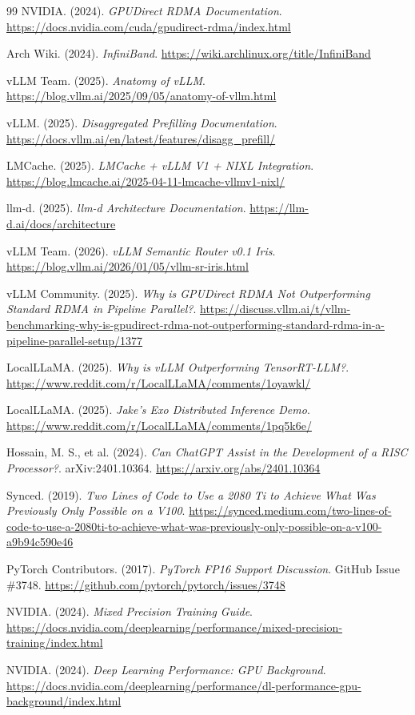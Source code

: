 \documentclass[10pt,letterpaper]{article}
\begin{document}
\begin{thebibliography}{99}
NVIDIA. (2024). \textit{GPUDirect RDMA Documentation}. \url{https://docs.nvidia.com/cuda/gpudirect-rdma/index.html}

Arch Wiki. (2024). \textit{InfiniBand}. \url{https://wiki.archlinux.org/title/InfiniBand}

vLLM Team. (2025). \textit{Anatomy of vLLM}. \url{https://blog.vllm.ai/2025/09/05/anatomy-of-vllm.html}

vLLM. (2025). \textit{Disaggregated Prefilling Documentation}. \url{https://docs.vllm.ai/en/latest/features/disagg_prefill/}

LMCache. (2025). \textit{LMCache + vLLM V1 + NIXL Integration}. \url{https://blog.lmcache.ai/2025-04-11-lmcache-vllmv1-nixl/}

llm-d. (2025). \textit{llm-d Architecture Documentation}. \url{https://llm-d.ai/docs/architecture}

vLLM Team. (2026). \textit{vLLM Semantic Router v0.1 Iris}. \url{https://blog.vllm.ai/2026/01/05/vllm-sr-iris.html}

vLLM Community. (2025). \textit{Why is GPUDirect RDMA Not Outperforming Standard RDMA in Pipeline Parallel?}. \url{https://discuss.vllm.ai/t/vllm-benchmarking-why-is-gpudirect-rdma-not-outperforming-standard-rdma-in-a-pipeline-parallel-setup/1377}

LocalLLaMA. (2025). \textit{Why is vLLM Outperforming TensorRT-LLM?}. \url{https://www.reddit.com/r/LocalLLaMA/comments/1oyawkl/}

LocalLLaMA. (2025). \textit{Jake's Exo Distributed Inference Demo}. \url{https://www.reddit.com/r/LocalLLaMA/comments/1pq5k6e/}

Hossain, M. S., et al. (2024). \textit{Can ChatGPT Assist in the Development of a RISC Processor?}. arXiv:2401.10364. \url{https://arxiv.org/abs/2401.10364}

Synced. (2019). \textit{Two Lines of Code to Use a 2080 Ti to Achieve What Was Previously Only Possible on a V100}. \url{https://synced.medium.com/two-lines-of-code-to-use-a-2080ti-to-achieve-what-was-previously-only-possible-on-a-v100-a9b94c590e46}

PyTorch Contributors. (2017). \textit{PyTorch FP16 Support Discussion}. GitHub Issue \#3748. \url{https://github.com/pytorch/pytorch/issues/3748}

NVIDIA. (2024). \textit{Mixed Precision Training Guide}. \url{https://docs.nvidia.com/deeplearning/performance/mixed-precision-training/index.html}

NVIDIA. (2024). \textit{Deep Learning Performance: GPU Background}. \url{https://docs.nvidia.com/deeplearning/performance/dl-performance-gpu-background/index.html}

\end{thebibliography}
\end{document}
